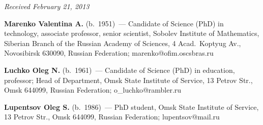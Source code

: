 \vspace*{-6pt}

\hfill{\small\textit{Received February 21, 2013}}


\Contr

\noindent
\textbf{Marenko Valentina A.} (b.\ 1951)~--- Candidate of Science (PhD)
in technology, associate professor, senior scientist, Sobolev Institute of
Mathematics, Siberian Branch of the Russian Academy of Sciences,
4 Acad.\ Koptyug Av., 
Novosibirsk 630090, Russian Federation; marenko@ofim.oscsbras.ru

\vspace*{3pt}

\noindent
\textbf{Luchko Oleg N.} (b.\ 1961)~--- Candidate of Science (PhD) in
education, professor; Head of Department, Omsk State Institute of Service,
13 Petrov Str., 
Omsk 644099, Russian Federation; o\_luchko@rambler.ru

\vspace*{3pt}

\noindent
\textbf{Lupentsov Oleg S.} (b.\ 1986)~--- PhD student, Omsk State Institute of Service,
13 Petrov Str., 
Omsk 644099, Russian Federation; lupentsov@mail.ru




 \label{end\stat}
 
\renewcommand{\bibname}{\protect\rm Литература}